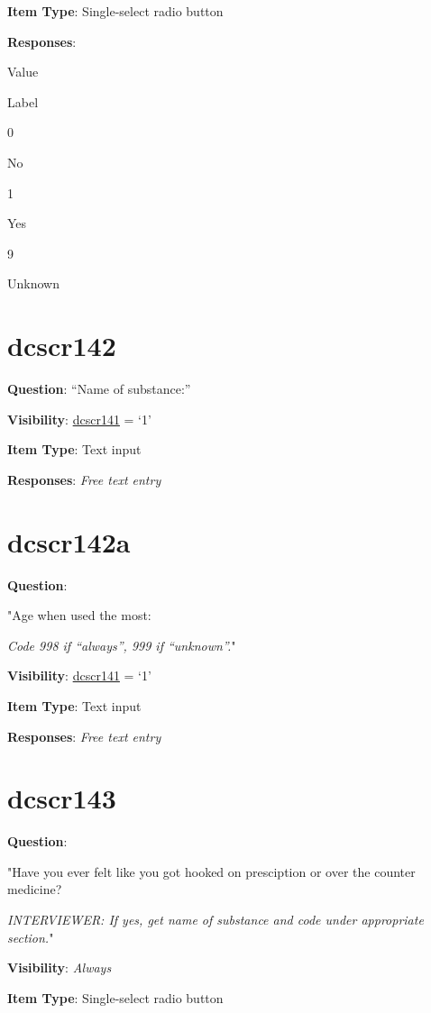 \documentclass[]{book}
\begin{document}
\textbf{Item Type}: Single-select radio button

\textbf{Responses}:

Value

Label

0

No

1

Yes

9

Unknown

\hypertarget{dcscr142}{%
\section{dcscr142}\label{dcscr142}}

\textbf{Question}: ``Name of substance:''

\textbf{Visibility}: \protect\hyperlink{dcscr141}{dcscr141} = `1'

\textbf{Item Type}: Text input

\textbf{Responses}: \emph{Free text entry}

\hypertarget{dcscr142a}{%
\section{dcscr142a}\label{dcscr142a}}

\textbf{Question}:

"Age when used the most:

\emph{Code 998 if ``always'', 999 if ``unknown''.}"

\textbf{Visibility}: \protect\hyperlink{dcscr141}{dcscr141} = `1'

\textbf{Item Type}: Text input

\textbf{Responses}: \emph{Free text entry}

\hypertarget{dcscr143}{%
\section{dcscr143}\label{dcscr143}}

\textbf{Question}:

"Have you ever felt like you got hooked on presciption or over the counter medicine?

\emph{INTERVIEWER: If yes, get name of substance and code under appropriate section.}"

\textbf{Visibility}: \emph{Always}

\textbf{Item Type}: Single-select radio button
\end{document}

